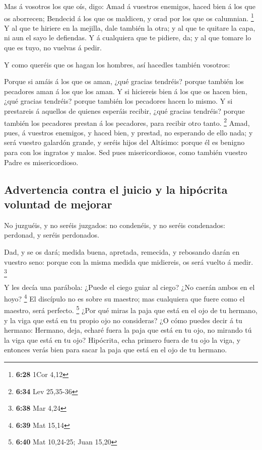  Mas á vosotros los que oís, digo: Amad á vuestros
enemigos, haced bien á los que os aborrecen;  Bendecid á
los que os maldicen, y orad por los que os calumnian. \footnote{\textbf{6:28}
  1Cor 4,12}  Y al que te hiriere en la mejilla, dale
también la otra; y al que te quitare la capa, ni aun el sayo le
defiendas.  Y á cualquiera que te pidiere, da; y al que
tomare lo que es tuyo, no vuelvas á pedir.

 Y como queréis que os hagan los hombres, así hacedles
también vosotros:

 Porque si amáis á los que os aman, ¿qué gracias
tendréis? porque también los pecadores aman á los que los aman.
 Y si hiciereis bien á los que os hacen bien, ¿qué
gracias tendréis? porque también los pecadores hacen lo mismo.
 Y si prestareis á aquellos de quienes esperáis recibir,
¿qué gracias tendréis? porque también los pecadores prestan á los
pecadores, para recibir otro tanto. \footnote{\textbf{6:34} Lev 25,35-36}
 Amad, pues, á vuestros enemigos, y haced bien, y
prestad, no esperando de ello nada; y será vuestro galardón grande, y
seréis hijos del Altísimo: porque él es benigno para con los ingratos y
malos.  Sed pues misericordiosos, como también vuestro
Padre es misericordioso.

\hypertarget{advertencia-contra-el-juicio-y-la-hipuxf3crita-voluntad-de-mejorar}{%
\subsection{Advertencia contra el juicio y la hipócrita voluntad de
mejorar}\label{advertencia-contra-el-juicio-y-la-hipuxf3crita-voluntad-de-mejorar}}

 No juzguéis, y no seréis juzgados: no condenéis, y no
seréis condenados: perdonad, y seréis perdonados.

 Dad, y se os dará; medida buena, apretada, remecida, y
rebosando darán en vuestro seno: porque con la misma medida que
midiereis, os será vuelto á medir. \footnote{\textbf{6:38} Mar 4,24}

 Y les decía una parábola: ¿Puede el ciego guiar al
ciego? ¿No caerán ambos en el hoyo? \footnote{\textbf{6:39} Mat 15,14}
 El discípulo no es sobre su maestro; mas cualquiera que
fuere como el maestro, será perfecto. \footnote{\textbf{6:40} Mat
  10,24-25; Juan 15,20}  ¿Por qué miras la paja que está
en el ojo de tu hermano, y la viga que está en tu propio ojo no
consideras?  ¿O cómo puedes decir á tu hermano: Hermano,
deja, echaré fuera la paja que está en tu ojo, no mirando tú la viga que
está en tu ojo? Hipócrita, echa primero fuera de tu ojo la viga, y
entonces verás bien para sacar la paja que está en el ojo de tu hermano.

